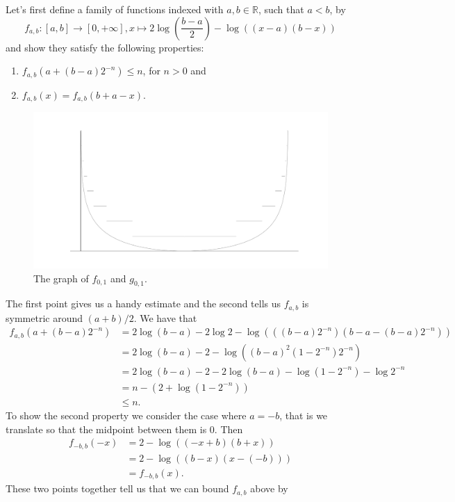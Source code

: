 \documentclass[a4paper,12pt,twoside,BCOR=10mm]{scrbook}
\theoremstyle{definition}
\theoremstyle{definition}
\theoremstyle{definition}
\begin{document}
Let's first define a family of functions indexed with $a, b \in \mathbb{R}$, such that $a < b$, by
\[
\label{index30}
	f_{a, b}: [a, b] \rightarrow [0, +\infty],
	x \mapsto 2\log \left ( \frac{b - a}{2} \right ) - \log((x - a)(b - x))
\]
and show they satisfy the following properties:
\begin{enumerate}
\item
$f_{a, b}(a + (b - a)2^{-n}) \leq n$, for $n > 0$ and
\item
$f_{a, b}(x) = f_{a, b}(b + a - x)$.
\end{enumerate}
\begin{figure}[h]
\centering
\includegraphics[width=1\textwidth]{graph2}
\caption{The graph of $f_{0, 1}$ and $g_{0, 1}$.}
\end{figure}
The first point gives us a handy estimate and the second tells us $f_{a, b}$ is symmetric around $(a + b)/2$.
We have that
\begin{align*}
	f_{a, b}(a + (b - a)2^{-n})
	&= 2\log (b - a) - 2\log 2 - \log (((b - a)2^{-n})(b - a - (b - a)2^{-n}))\\
	&= 2\log (b - a) - 2 - \log ((b - a)^2(1 - 2^{-n})2^{-n})\\
	&= 2\log (b - a) - 2 - 2\log (b - a) - \log (1 - 2^{-n}) - \log 2^{-n}\\
	&= n - (2 + \log (1 - 2^{-n}))\\
	&\leq n.
\end{align*}
To show the second property we consider the case where $a = -b$, that is we translate so that the midpoint between them is $0$.
Then
\begin{align*}
f_{-b, b}(-x)
&= 2 - \log ((-x + b)(b + x))\\
&= 2 - \log ((b - x)(x - (-b)))\\
&= f_{-b, b}(x).
\end{align*}
These two points together tell us that we can bound $f_{a, b}$ above by
\end{document}
